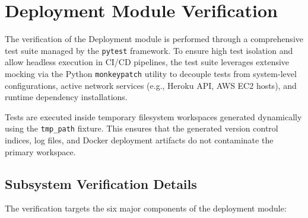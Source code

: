 \documentclass[12pt,a4paper,oneside]{report}
\begin{document}
\section{Deployment Module Verification}
\noindent The verification of the Deployment module is performed through a comprehensive test suite managed by the \texttt{pytest} framework. To ensure high test isolation and allow headless execution in CI/CD pipelines, the test suite leverages extensive mocking via the Python \texttt{monkeypatch} utility to decouple tests from system-level configurations, active network services (e.g., Heroku API, AWS EC2 hosts), and runtime dependency installations. 

\noindent Tests are executed inside temporary filesystem workspaces generated dynamically using the \texttt{tmp\_path} fixture. This ensures that the generated version control indices, log files, and Docker deployment artifacts do not contaminate the primary workspace.

\subsection{Subsystem Verification Details}
\noindent The verification targets the six major components of the deployment module:
\end{document}
